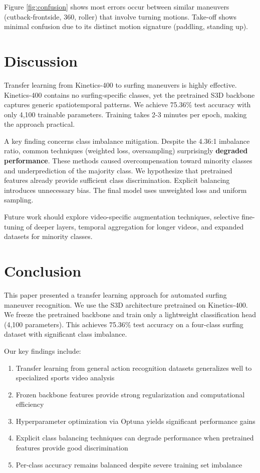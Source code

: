 \documentclass[11pt, journal]{IEEEtran}
\begin{document}
Figure \ref{fig:confusion} shows most errors occur between similar maneuvers (cutback-frontside, 360, roller) that involve turning motions. Take-off shows minimal confusion due to its distinct motion signature (paddling, standing up).

\section{Discussion}
\label{sec:discussion}

Transfer learning from Kinetics-400 to surfing maneuvers is highly effective. Kinetics-400 contains no surfing-specific classes, yet the pretrained S3D backbone captures generic spatiotemporal patterns. We achieve 75.36\% test accuracy with only 4,100 trainable parameters. Training takes 2-3 minutes per epoch, making the approach practical.

A key finding concerns class imbalance mitigation. Despite the 4.36:1 imbalance ratio, common techniques (weighted loss, oversampling) surprisingly \textbf{degraded performance}. These methods caused overcompensation toward minority classes and underprediction of the majority class. We hypothesize that pretrained features already provide sufficient class discrimination. Explicit balancing introduces unnecessary bias. The final model uses unweighted loss and uniform sampling.

Future work should explore video-specific augmentation techniques, selective fine-tuning of deeper layers, temporal aggregation for longer videos, and expanded datasets for minority classes.

\section{Conclusion}
\label{sec:conclusion}

This paper presented a transfer learning approach for automated surfing maneuver recognition. We use the S3D architecture pretrained on Kinetics-400. We freeze the pretrained backbone and train only a lightweight classification head (4,100 parameters). This achieves 75.36\% test accuracy on a four-class surfing dataset with significant class imbalance.

Our key findings include:
\begin{enumerate}
    \item Transfer learning from general action recognition datasets generalizes well to specialized sports video analysis
    \item Frozen backbone features provide strong regularization and computational efficiency
    \item Hyperparameter optimization via Optuna yields significant performance gains
    \item Explicit class balancing techniques can degrade performance when pretrained features provide good discrimination
    \item Per-class accuracy remains balanced despite severe training set imbalance
\end{enumerate}
\end{document}
